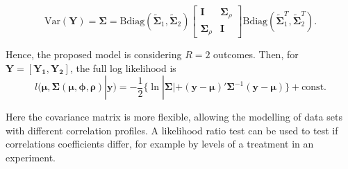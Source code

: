 \documentclass[useAMS,referee]{biom}
\begin{document}
\begin{equation*}	
\mbox{Var}(\mathbf{Y})=\boldsymbol{\Sigma}= \mbox{Bdiag}(\tilde{\boldsymbol{\Sigma}}_1, \tilde{\boldsymbol{\Sigma}}_2)
\left[\begin{array}{cc}
\mathbf{I} & \boldsymbol{\Sigma}_\rho\\
\boldsymbol{\Sigma}_\rho & \mathbf{I} \end{array} \right]
\mbox{Bdiag}(\tilde{\boldsymbol{\Sigma}}_1^{T}, \boldsymbol{\tilde{\Sigma}}_2^{T}).
\end{equation*}

Hence, the proposed model is considering $R=2$ outcomes. Then, for $\mathbf{Y} = \mathbf{[Y_1,Y_2]}$, the full log likelihood is
\begin{equation}\label{16}
l(\boldsymbol{\mu},\boldsymbol{\Sigma(\mu,\phi,\rho)}| \mathbf{y}) = -\frac{1}{2}\{\ln |\boldsymbol{\Sigma}| +  (\mathbf{y}-\boldsymbol{\mu})'\boldsymbol{\Sigma}^{-1} (\mathbf{y}-\boldsymbol{\mu})\} + \mbox{const}.
\end{equation}



Here the covariance matrix is more flexible, allowing the modelling of data sets with different correlation profiles. A likelihood ratio test can be used to test if correlations coefficients differ, for example by levels of a treatment in an experiment. 
\end{document}
